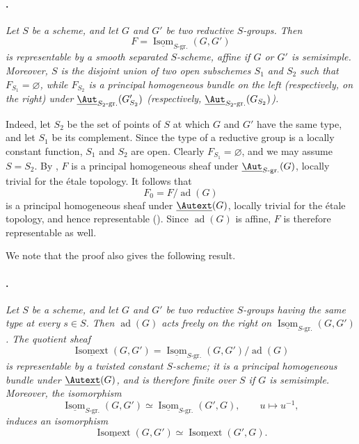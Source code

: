 
\paragraph{.}
\emph{Let \(S\) be a scheme, and let \(G\) and \(G'\) be two
reductive \(S\)-groups. Then}
\[
  F=\underline{\operatorname{Isom}}_{S\text{-}\mathrm{gr.}}(G,G')
\]
\emph{is representable by a smooth separated \(S\)-scheme, affine
if \(G\) or \(G'\) is semisimple. Moreover, \(S\) is the disjoint
union of two open subschemes \(S_1\) and \(S_2\) such that
\(F_{S_1}=\varnothing\), while \(F_{S_2}\) is a principal homogeneous
bundle on the left \textup{(respectively, on the right)} under
\(\underline{\Aut}_{S_2\text{-}\mathrm{gr.}}(G'_{S_2})\)
\textup{(respectively,
\(\underline{\Aut}_{S_2\text{-}\mathrm{gr.}}(G_{S_2})\)).}}

Indeed, let \(S_2\) be the set of points of \(S\) at which \(G\) and
\(G'\) have the same type, and let \(S_1\) be its complement. Since
the type of a reductive group is a locally constant function, \(S_1\)
and \(S_2\) are open. Clearly \(F_{S_1}=\varnothing\), and we may
assume \(S=S_2\). By , \(F\) is a principal
homogeneous sheaf under
\(\underline{\Aut}_{S\text{-}\mathrm{gr.}}(G)\), locally trivial for
the étale topology. It follows that
\[
  F_0=F/\operatorname{ad}(G)
\]
is a principal homogeneous sheaf under \(\underline{\Autext}(G)\),
locally trivial for the étale topology, and hence representable
\textup{()}. Since \(\operatorname{ad}(G)\) is affine,
\(F\) is therefore representable as well.

We note that the proof also gives the following result.

\paragraph{.}
\emph{Let \(S\) be a scheme, and let \(G\) and \(G'\) be two
reductive \(S\)-groups having the same type at every \(s\in S\).
Then \(\operatorname{ad}(G)\) acts freely on the right on
\(\underline{\operatorname{Isom}}_{S\text{-}\mathrm{gr.}}(G,G')\).
The quotient sheaf}
\[
  \underline{\operatorname{Isomext}}(G,G')
  =
  \underline{\operatorname{Isom}}_{S\text{-}\mathrm{gr.}}(G,G')
  /\operatorname{ad}(G)
\]
\emph{is representable by a twisted constant \(S\)-scheme; it is a
principal homogeneous bundle under \(\underline{\Autext}(G)\), and
is therefore finite over \(S\) if \(G\) is semisimple. Moreover, the
isomorphism}
\[
  \underline{\operatorname{Isom}}_{S\text{-}\mathrm{gr.}}(G,G')
  \simeq
  \underline{\operatorname{Isom}}_{S\text{-}\mathrm{gr.}}(G',G),
  \qquad u\longmapsto u^{-1},
\]
\emph{induces an isomorphism}
\[
  \underline{\operatorname{Isomext}}(G,G')
  \simeq
  \underline{\operatorname{Isomext}}(G',G).
\]

